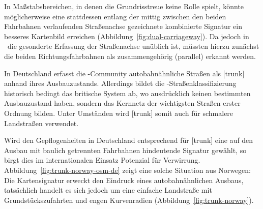 \documentclass[../main/thesis.tex]{subfiles}
\begin{document}
In Maßstabsbereichen, in denen die Grundrisstreue keine Rolle spielt, könnte möglicherweise eine stattdessen entlang der mittig zwischen den beiden Fahrbahnen verlaufenden Straßenachse gezeichnete kombinierte Signatur ein besseres Kartenbild erreichen (Abbildung~\ref{fig:dual-carriageway}).
Da jedoch in \osm\ die gesonderte Erfassung der Straßenachse unüblich ist, müssten hierzu zunächst die beiden Richtungsfahrbahnen als zusammengehörig (parallel) erkannt werden.



In Deutschland erfasst die \osm-Community autobahnähnliche Straßen als [trunk] anhand ihres Ausbauzustands.
Allerdings bildet die \osm-Straßenklassifizierung historisch bedingt das britische System ab, wo  ausdrücklich keinen bestimmten Ausbauzustand haben, sondern das Kernnetz der wichtigsten Straßen erster Ordnung bilden.
Unter Umständen wird [trunk] somit auch für schmalere Landstraßen verwendet.

Wird den Gepflogenheiten in Deutschland entsprechend für [trunk] eine auf den Ausbau mit baulich getrennten Fahrbahnen hindeutende Signatur gewählt, so birgt dies im internationalen Einsatz Potenzial für Verwirrung.
Abbildung~\ref{fig:trunk-norway-osm-de} zeigt eine solche Situation aus Norwegen:
Die Kartensignatur erweckt den Eindruck eines autobahnähnlichen Ausbaus, tatsächlich handelt es sich jedoch um eine einfache Landstraße mit Grundstückszufahrten und engen Kurvenradien (Abbildung~\ref{fig:trunk-norway}).


\end{document}

